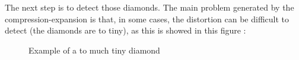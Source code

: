 The next step is to detect those diamonds. The main problem generated by the compression-expansion is that, in some cases, the distortion can be difficult to detect (the diamonds are to tiny), as this is showed in this figure :
\begin{figure}
\caption{\label{distortion} Example of a to much tiny diamond}
\end{figure}

